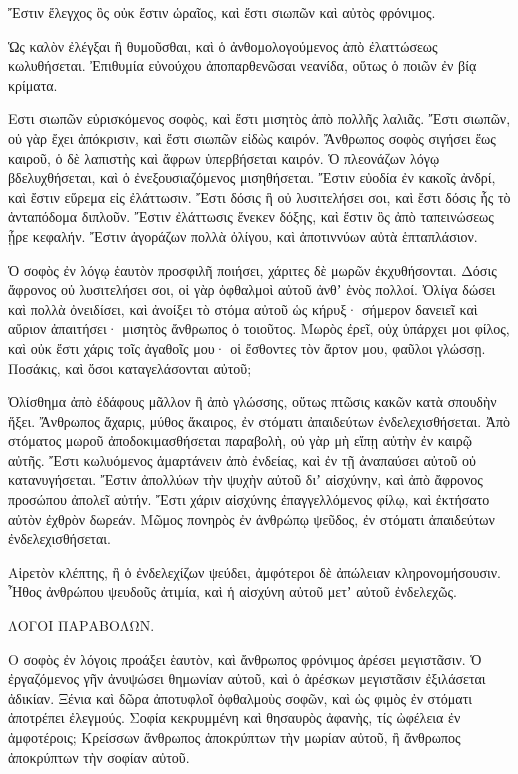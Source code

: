 {Ἔστιν ἔλεγχος ὃς οὐκ ἔστιν ὡραῖος, καὶ ἔστι σιωπῶν καὶ αὐτὸς φρόνιμος.
\par }{\PP {}Ὡς καλὸν ἐλέγξαι ἢ θυμοῦσθαι,
καὶ ὁ ἀνθομολογούμενος ἀπὸ ἐλαττώσεως κωλυθήσεται.
Ἐπιθυμία εὐνούχου ἀποπαρθενῶσαι νεανίδα, οὕτως ὁ ποιῶν ἐν βίᾳ κρίματα.
\par }{\PP {}Εστι σιωπῶν εὑρισκόμενος σοφὸς, καὶ ἔστι μισητὸς ἀπὸ πολλῆς λαλιᾶς.
Ἔστι σιωπῶν, οὐ γὰρ ἔχει ἀπόκρισιν, καὶ ἔστι σιωπῶν εἰδὼς καιρόν.
Ἄνθρωπος σοφὸς σιγήσει ἕως καιροῦ, ὁ δὲ λαπιστὴς καὶ ἄφρων ὑπερβήσεται καιρόν.
Ὁ πλεονάζων λόγῳ βδελυχθήσεται, καὶ ὁ ἐνεξουσιαζόμενος μισηθήσεται.
Ἔστιν εὐοδία ἐν κακοῖς ἀνδρί, καὶ ἔστιν εὕρεμα εἰς ἐλάττωσιν.
Ἔστι δόσις ἣ οὐ λυσιτελήσει σοι, καὶ ἔστι δόσις ἧς τὸ ἀνταπόδομα διπλοῦν.
Ἔστιν ἐλάττωσις ἕνεκεν δόξης, καὶ ἔστιν ὃς ἀπὸ ταπεινώσεως ᾖρε κεφαλήν.
Ἔστιν ἀγοράζων πολλὰ ὀλίγου, καὶ ἀποτιννύων αὐτὰ ἑπταπλάσιον.
\par }{\PP {}Ὁ σοφὸς ἐν λόγῳ ἑαυτὸν προσφιλῆ ποιήσει, χάριτες δὲ μωρῶν ἐκχυθήσονται.
Δόσις ἄφρονος οὐ λυσιτελήσει σοι, οἱ γὰρ ὀφθαλμοὶ αὐτοῦ ἀνθʼ ἑνὸς πολλοί.
Ὀλίγα δώσει καὶ πολλὰ ὀνειδίσει, καὶ ἀνοίξει τὸ στόμα αὐτοῦ ὡς κήρυξ· σήμερον δανειεῖ καὶ αὔριον ἀπαιτήσει· μισητὸς ἄνθρωπος ὁ τοιοῦτος.
Μωρὸς ἐρεῖ, οὐχ ὑπάρχει μοι φίλος, καὶ οὐκ ἔστι χάρις τοῖς ἀγαθοῖς μου· οἱ ἔσθοντες τὸν ἄρτον μου, φαῦλοι γλώσσῃ.
Ποσάκις, καὶ ὅσοι καταγελάσονται αὐτοῦ;
\par }{\PP {}Ὀλίσθημα ἀπὸ ἐδάφους μᾶλλον ἢ ἀπὸ γλώσσης, οὕτως πτῶσις κακῶν κατὰ σπουδὴν ἥξει.
Ἄνθρωπος ἄχαρις, μύθος ἄκαιρος, ἐν στόματι ἀπαιδεύτων ἐνδελεχισθήσεται.
Ἀπὸ στόματος μωροῦ ἀποδοκιμασθήσεται παραβολὴ, οὐ γὰρ μὴ εἴπῃ αὐτὴν ἐν καιρῷ αὐτῆς.
Ἔστι κωλυόμενος ἁμαρτάνειν ἀπὸ ἐνδείας, καὶ ἐν τῇ ἀναπαύσει αὐτοῦ οὐ κατανυγήσεται.
Ἔστιν ἀπολλύων τὴν ψυχὴν αὐτοῦ διʼ αἰσχύνην, καὶ ἀπὸ ἄφρονος προσώπου ἀπολεῖ αὐτήν.
Ἔστι χάριν αἰσχύνης ἐπαγγελλόμενος φίλῳ, καὶ ἐκτήσατο αὐτὸν ἐχθρὸν δωρεάν.
Μῶμος πονηρὸς ἐν ἀνθρώπῳ ψεῦδος, ἐν στόματι ἀπαιδεύτων ἐνδελεχισθήσεται.
\par }{\PP {}Αἱρετὸν κλέπτης, ἢ ὁ ἐνδελεχίζων ψεύδει, ἀμφότεροι δὲ ἀπώλειαν κληρονομήσουσιν.
Ἦθος ἀνθρώπου ψευδοῦς ἀτιμία, καὶ ἡ αἰσχύνη αὐτοῦ μετʼ αὐτοῦ ἐνδελεχῶς.
\par }{\PP ΛΟΓΟΙ ΠΑΡΑΒΟΛΩΝ.
\par }{\PP {}Ο σοφὸς ἐν λόγοις προάξει ἑαυτὸν, καὶ ἄνθρωπος φρόνιμος ἀρέσει μεγιστᾶσιν.
Ὁ ἐργαζόμενος γῆν ἀνυψώσει θημωνίαν αὐτοῦ, καὶ ὁ ἀρέσκων μεγιστᾶσιν ἐξιλάσεται ἀδικίαν.
Ξένια καὶ δῶρα ἀποτυφλοῖ ὀφθαλμοὺς σοφῶν, καὶ ὡς φιμὸς ἐν στόματι ἀποτρέπει ἐλεγμούς.
Σοφία κεκρυμμένη καὶ θησαυρὸς ἀφανὴς, τίς ὠφέλεια ἐν ἀμφοτέροις;
Κρείσσων ἄνθρωπος ἀποκρύπτων τὴν μωρίαν αὐτοῦ, ἢ ἄνθρωπος ἀποκρύπτων τὴν σοφίαν αὐτοῦ.

}
